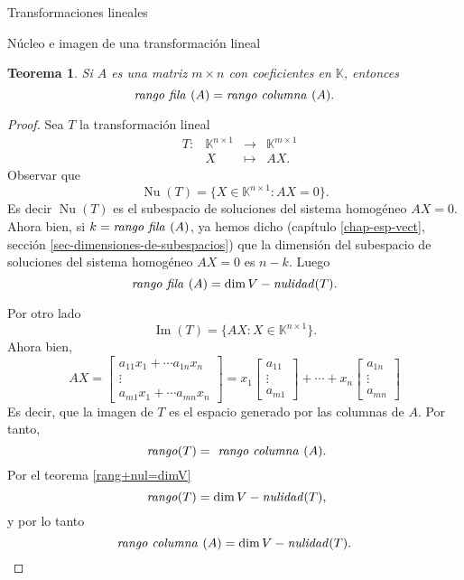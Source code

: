 \documentclass[a4paper,12pt,twoside,spanish,reqno]{amsbook}
\newtheorem{teorema}{Teorema}[section]
\theoremstyle{definition}
\theoremstyle{remark}
\newcommand{\img}{\operatorname{Im}}
\newcommand{\nuc}{\operatorname{Nu}}
\newcommand{\K}{\mathbb K}
\begin{document}
\begin{chapter}{Transformaciones lineales}
\begin{section}{Núcleo e imagen de una transformación lineal}
        \begin{teorema}
            Si $A$ es una matriz $m \times n$ con coeficientes  en $\K$, entonces
            $$
            \text{\textit{rango fila }} (A) = \text{\textit{rango  columna }} (A).
            $$
        \end{teorema}
        \begin{proof}
            Sea $T$ la transformación lineal
            \begin{equation*}
                \begin{array}{lllll}
                &T: &\K^{n \times 1} &\to &\K^{m \times 1} \\
                &&X &\mapsto &AX.
                \end{array}
            \end{equation*}
            Observar que
            $$
            \nuc(T) = \{X \in \K^{n \times 1}: AX=0 \}.
            $$
            Es decir $\nuc(T)$  es el subespacio de soluciones del sistema homogéneo $AX=0$. Ahora bien, si $k = \text{\textit{rango fila }} (A)$, ya hemos dicho (capítulo \ref{chap-esp-vect}, sección \ref{sec-dimensiones-de-subespacios}) que la dimensión del subespacio de soluciones del sistema homogéneo $AX=0$ es $n-k$. Luego
            \begin{equation}\label{rangofila=n-nulT}
                \text{\textit{rango fila }} (A) = \dim V - \text{\textit{nulidad}}(T). 
            \end{equation}
            
            Por otro lado 
            $$
            \img(T) = \{AX: X \in \K^{n \times 1} \}.
            $$
            Ahora bien, 
            $$
            AX = 
            \begin{bmatrix} a_{11} x_1 +\cdots a_{1n} x_n \\ \vdots \\ a_{m1} x_1 +\cdots a_{mn} x_n  \end{bmatrix}
            = 
            x_1\begin{bmatrix} a_{11} \\ \vdots \\ a_{m1} \end{bmatrix} + \cdots +
            x_n\begin{bmatrix}  a_{1n}  \\ \vdots \\ a_{mn}  \end{bmatrix}
            $$
            Es decir, que la imagen de $T$ es el espacio generado por las columnas de $A$. Por tanto,
            $$
            \text{\textit{ rango}}(T) =\text{\textit{ rango  columna }}(A).
            $$
            Por  el  teorema \ref{rang+nul=dimV}
            $$
            \text{\textit{ rango}}(T) = \dim V - \text{\textit{nulidad}}(T),
            $$
            y por lo tanto
            \begin{equation}\label{rangocolumna=n-nulT}
            \text{\textit{rango columna }} (A) = \dim V - \text{\textit{nulidad}}(T). 
            \end{equation}
            

\end{proof}
\end{section}
\end{chapter}
\end{document}
